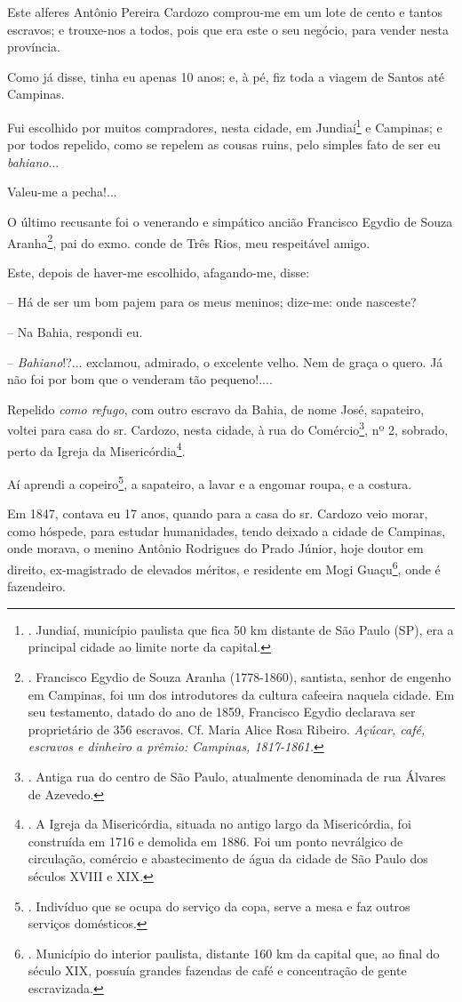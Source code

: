 Este alferes Antônio Pereira Cardozo comprou-me em um lote de cento e
tantos escravos; e trouxe-nos a todos, pois que era este o seu negócio,
para vender nesta província.

Como já disse, tinha eu apenas 10 anos; e, à pé, fiz toda a viagem de
Santos até Campinas.

Fui escolhido por muitos compradores, nesta cidade, em Jundiaí\footnote{.
  Jundiaí, município paulista que fica 50 km distante de São Paulo (SP),
  era a principal cidade ao limite norte da capital.} e Campinas; e por
todos repelido, como se repelem as cousas ruins, pelo simples fato de
ser eu \emph{bahiano}...

Valeu-me a pecha!...

O último recusante foi o venerando e simpático ancião Francisco Egydio
de Souza Aranha\footnote{. Francisco Egydio de Souza Aranha (1778-1860),
  santista, senhor de engenho em Campinas, foi um dos introdutores da
  cultura cafeeira naquela cidade. Em seu testamento, datado do ano de
  1859, Francisco Egydio declarava ser proprietário de 356 escravos. Cf.
  Maria Alice Rosa Ribeiro. \emph{Açúcar, café, escravos e dinheiro a
  prêmio: Campinas, 1817-1861.}}, pai do exmo. conde de Três Rios, meu
respeitável amigo.

Este, depois de haver-me escolhido, afagando-me, disse:

-- Há de ser um bom pajem para os meus meninos; dize-me: onde nasceste?

-- Na Bahia, respondi eu.

-- \emph{Bahiano}!?... exclamou, admirado, o excelente velho. Nem de
graça o quero. Já não foi por bom que o venderam tão pequeno!....

Repelido \emph{como refugo}, com outro escravo da Bahia, de nome José,
sapateiro, voltei para casa do sr. Cardozo, nesta cidade, à rua do
Comércio\footnote{. Antiga rua do centro de São Paulo, atualmente
  denominada de rua Álvares de Azevedo.}, nº 2, sobrado, perto da Igreja
da Misericórdia\footnote{. A Igreja da Misericórdia, situada no antigo
  largo da Misericórdia, foi construída em 1716 e demolida em 1886. Foi
  um ponto nevrálgico de circulação, comércio e abastecimento de água da
  cidade de São Paulo dos séculos XVIII e XIX.}.

Aí aprendi a copeiro\footnote{. Indivíduo que se ocupa do serviço da
  copa, serve a mesa e faz outros serviços domésticos.}, a sapateiro, a
lavar e a engomar roupa, e a costura.

Em 1847, contava eu 17 anos, quando para a casa do sr. Cardozo veio
morar, como hóspede, para estudar humanidades, tendo deixado a cidade de
Campinas, onde morava, o menino Antônio Rodrigues do Prado Júnior, hoje
doutor em direito, ex-magistrado de elevados méritos, e residente em
Mogi Guaçu\footnote{. Município do interior paulista, distante 160 km da
  capital que, ao final do século XIX, possuía grandes fazendas de café
  e concentração de gente escravizada.}, onde é fazendeiro.

